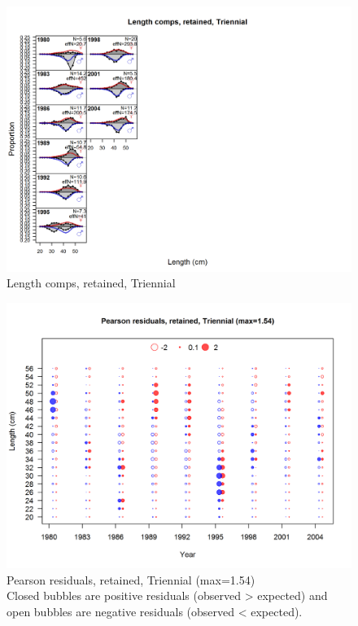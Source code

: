 \documentclass[12pt,]{article}
\begin{document}
\begin{figure}[htbp]
\centering
\includegraphics{./r4ss/plots_mod1/comp_lenfit_flt5mkt2.png}
\caption{Length comps, retained, Triennial
\label{fig:mod1_22_comp_lenfit_flt5mkt2}}
\end{figure}

\begin{figure}[htbp]
\centering
\includegraphics{./r4ss/plots_mod1/comp_lenfit_residsflt5mkt2.png}
\caption{Pearson residuals, retained, Triennial (max=1.54)\\
Closed bubbles are positive residuals (observed \textgreater{} expected)
and open bubbles are negative residuals (observed \textless{} expected).
\label{fig:mod1_23_comp_lenfit_residsflt5mkt2}}
\end{figure}
\end{document}
